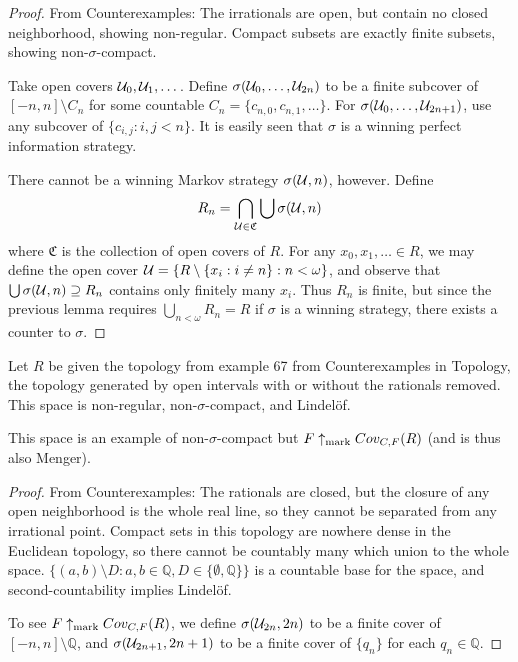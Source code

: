   \begin{proof}
  From Counterexamples: The irrationals are open, but contain no closed neighborhood, showing non-regular. Compact subsets are exactly finite subsets, showing non-$\sigma$-compact.

  Take open covers $\mathcal{U}_0,\mathcal{U}_1,\dots$. Define $\sigma(\mathcal{U}_0,\dots,\mathcal{U}_{2n})$ to be a finite subcover of $[-n,n]\setminus C_n$ for some countable $C_n=\{c_{n,0}, c_{n,1}, \dots\}$. For $\sigma(\mathcal{U}_0,\dots,\mathcal{U}_{2n+1})$, use any subcover of $\{c_{i,j} : i,j < n\}$. It is easily seen that $\sigma$ is a winning perfect information strategy.

  There cannot be a winning Markov strategy $\sigma(\mathcal{U},n)$, however. Define 
      \[
        R_n = \bigcap_{\mathcal{U}\in\mathfrak{C}} \bigcup\sigma(\mathcal{U},n)
      \]
  where $\mathfrak{C}$ is the collection of open covers of $R$. For any $x_0,x_1,\dots \in R$, we may define the open cover $\mathcal{U} = \{R \setminus \{x_i: i \not= n\} : n < \omega \}$, and observe that $\bigcup \sigma(\mathcal{U},n) \supseteq R_n$ contains only finitely many $x_i$. Thus $R_n$ is finite, but since the previous lemma requires $\bigcup_{n<\omega} R_n = R$ if $\sigma$ is a winning strategy, there exists a counter to $\sigma$.
  \end{proof}

  \begin{example}
  Let $R$ be given the topology from example 67 from Counterexamples in Topology, the topology generated by open intervals with or without the rationals removed. This space is non-regular, non-$\sigma$-compact, and Lindel\"of.

  This space is an example of non-$\sigma$-compact but $F \uparrow_{\text{mark}} Cov_{C,F}(R)$ (and is thus also Menger).
  \end{example}

  \begin{proof}
  From Counterexamples: The rationals are closed, but the closure of any open neighborhood is the whole real line, so they cannot be separated from any irrational point. Compact sets in this topology are nowhere dense in the Euclidean topology, so there cannot be countably many which union to the whole space. $\{(a,b)\setminus D : a,b\in\mathbb{Q},D\in\{\emptyset,\mathbb{Q}\}\}$ is a countable base for the space, and second-countability implies Lindel\"of.


  To see $F \uparrow_{\text{mark}} Cov_{C,F}(R)$, we define $\sigma(\mathcal{U}_{2n},2n)$ to be a finite cover of $[-n,n]\setminus\mathbb{Q}$, and $\sigma(\mathcal{U}_{2n+1},2n+1)$ to be a finite cover of $\{q_n\}$ for each $q_n\in\mathbb{Q}$.
  \end{proof}

